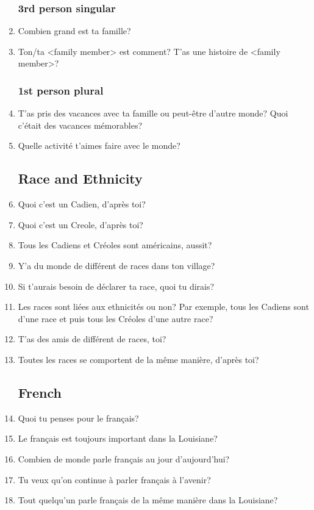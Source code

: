 \begin{enumerate}
    \subsubsection{3rd person singular}
      \item Combien grand est ta famille?
      \item Ton/ta <family member> est comment? T'as une histoire de <family member>?
    \subsubsection{1st person plural}
      \item T'as pris des vacances avec ta famille ou peut-être d'autre monde? Quoi c'était des vacances mémorables?
      \item Quelle activité t'aimes faire avec le monde?
  \subsection{Race and Ethnicity}
    \item Quoi c'est un Cadien, d'après toi?
    \item Quoi c'est un Creole, d'après toi?
    \item Tous les Cadiens et Créoles sont américains, aussit?
    \item Y'a du monde de différent de races dans ton village?
    \item Si t'aurais besoin de déclarer ta race, quoi tu dirais?
    \item Les races sont liées aux ethnicités ou non? Par exemple, tous les Cadiens sont d'une race et puis tous les Créoles d'une autre race?
    \item T'as des amis de différent de races, toi?
    \item Toutes les races se comportent de la même manière, d'après toi?
  \subsection{French}
    \item Quoi tu penses pour le français?
    \item Le français est toujours important dans la Louisiane?
    \item Combien de monde parle français au jour d'aujourd'hui?
    \item Tu veux qu'on continue à parler français à l'avenir?
    \item Tout quelqu'un parle français de la même manière dans la Louisiane?

\end{enumerate}
